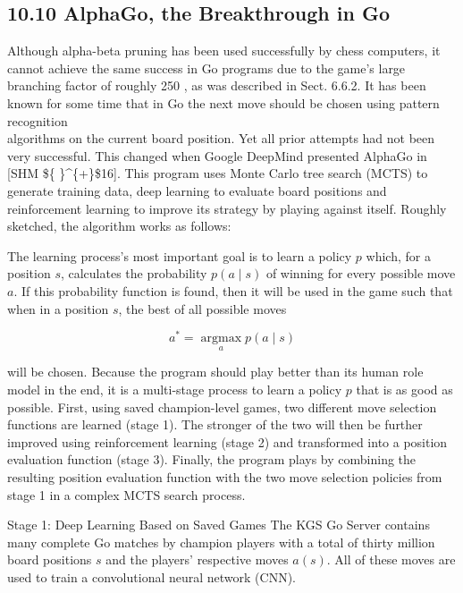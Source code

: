 \documentclass[10pt]{article}
\begin{document}
\subsection*{10.10 AlphaGo, the Breakthrough in Go}
Although alpha-beta pruning has been used successfully by chess computers, it cannot achieve the same success in Go programs due to the game's large branching factor of roughly 250 , as was described in Sect. 6.6.2. It has been known for some time that in Go the next move should be chosen using pattern recognition\\[0pt]
algorithms on the current board position. Yet all prior attempts had not been very successful. This changed when Google DeepMind presented AlphaGo in [SHM \$\{ \}\^{}\{+\}\$16]. This program uses Monte Carlo tree search (MCTS) to generate training data, deep learning to evaluate board positions and reinforcement learning to improve its strategy by playing against itself. Roughly sketched, the algorithm works as follows:


The learning process's most important goal is to learn a policy $p$ which, for a position $s$, calculates the probability $p(a \mid s)$ of winning for every possible move $a$. If this probability function is found, then it will be used in the game such that when in a position $s$, the best of all possible moves

$$
a^{*}=\underset{a}{\operatorname{argmax}} p(a \mid s)
$$

will be chosen. Because the program should play better than its human role model in the end, it is a multi-stage process to learn a policy $p$ that is as good as possible. First, using saved champion-level games, two different move selection functions are learned (stage 1). The stronger of the two will then be further improved using reinforcement learning (stage 2) and transformed into a position evaluation function (stage 3). Finally, the program plays by combining the resulting position evaluation function with the two move selection policies from stage 1 in a complex MCTS search process.

Stage 1: Deep Learning Based on Saved Games The KGS Go Server contains many complete Go matches by champion players with a total of thirty million board positions $s$ and the players' respective moves $a(s)$. All of these moves are used to train a convolutional neural network (CNN).
\end{document}
